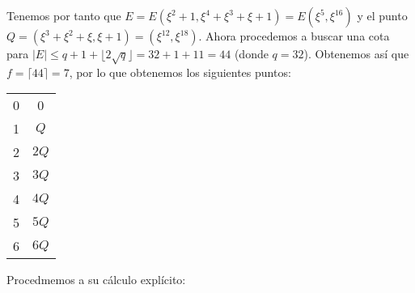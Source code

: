 \documentclass[fleqn]{article}
\begin{document}
    Tenemos por tanto que $E = E(\xi^2 + 1, \xi^4 + \xi^3 + \xi + 1) = E(\xi^5, \xi^{16})$ y  el punto $Q = (\xi^3 + \xi^2 + \xi, \xi + 1) = 
    (\xi^{12}, \xi^{18})$. Ahora procedemos a buscar una cota para $|E| \leq q + 1 + \lfloor 2 \sqrt{q} \rfloor = 32 + 1 + 11 = 44$ (donde $q = 32$).
    Obtenemos así que $f = \lceil 44 \rceil = 7$, por lo que obtenemos los siguientes puntos:
    \begin{center}
        \begin{tabular}{| c | c |}
            \hline
            0 & 0 \\
            1 & $Q$ \\
            2 & $2Q$ \\
            3 & $3Q$ \\
            4 & $4Q$ \\
            5 & $5Q$ \\
            6 & $6Q$ \\ \hline
        \end{tabular}
    \end{center}

    Procedmemos a su cálculo explícito:
\end{document}
